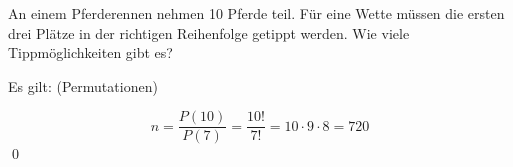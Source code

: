 \documentclass{abgabe}
\begin{document}
\begin{questions}
    \question
    An einem Pferderennen nehmen 10 Pferde teil. 
    Für eine Wette müssen die ersten drei Plätze in der richtigen Reihenfolge getippt werden. 
    Wie viele Tippmöglichkeiten gibt es?
    \begin{solution}
        Es gilt: (Permutationen)

        \[ 
            n = \frac{P(10)}{P(7)} = \frac{10!}{7!} = 10 \cdot 9 \cdot 8 = 720
        \] 
        \qed
    \end{solution}
\end{questions}
\end{document}
